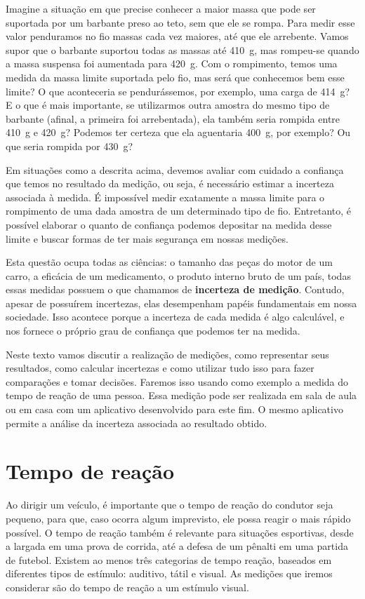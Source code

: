 \documentclass[12pt, a4paper]{article}
\begin{document}
Imagine a situação em que precise conhecer a maior massa que pode ser suportada por um barbante preso ao teto, sem que ele se rompa. Para medir esse valor penduramos no fio massas cada vez maiores, até que ele arrebente. Vamos supor que o barbante suportou todas as massas até 410~g, mas rompeu-se quando a massa suspensa foi aumentada para 420~g. Com o rompimento, temos uma medida da massa limite suportada pelo fio, mas será que conhecemos bem esse limite? O que aconteceria se pendurássemos, por exemplo, uma carga de 414~g? E o que é mais importante, se utilizarmos outra amostra do mesmo tipo de barbante (afinal, a primeira foi arrebentada), ela também seria rompida entre 410~g e 420~g? Podemos ter certeza que ela aguentaria 400~g, por exemplo? Ou que seria rompida por 430~g?

Em situações como a descrita acima, devemos avaliar com cuidado a confiança que temos no resultado da medição, ou seja, é necessário estimar a incerteza associada à medida. É impossível medir exatamente a massa limite para o rompimento de uma dada amostra de um determinado tipo de fio. Entretanto, é possível elaborar o quanto de confiança podemos depositar na medida desse limite e buscar formas de ter mais segurança em nossas medições.

Esta questão ocupa todas as ciências: o tamanho das peças do motor de um carro, a eficácia de um medicamento, o produto interno bruto de um país, todas essas medidas possuem o que chamamos de \textbf{incerteza de medição}. Contudo, apesar de possuírem incertezas, elas desempenham papéis fundamentais em nossa sociedade. Isso acontece porque a incerteza de cada medida é algo calculável, e nos fornece o próprio grau de confiança que podemos ter na medida.

Neste texto vamos discutir a realização de medições, como representar seus resultados, como calcular incertezas e como utilizar tudo isso para fazer comparações e tomar decisões. Faremos isso usando como exemplo a medida do tempo de reação de uma pessoa. Essa medição pode ser realizada em sala de aula ou em casa com um aplicativo desenvolvido para este fim. O mesmo aplicativo permite a análise da incerteza associada ao resultado obtido.

\section{Tempo de reação}

Ao dirigir um veículo, é importante que o tempo de reação do condutor seja pequeno, para que, caso ocorra algum imprevisto, ele possa reagir o mais rápido possível. O tempo de reação também é relevante para situações esportivas, desde a largada em uma prova de corrida, até a defesa de um pênalti em uma partida de futebol. 
Existem ao menos três categorias de tempo reação, baseados em diferentes tipos de estímulo: auditivo, tátil e visual. As medições que iremos considerar são do tempo de reação a um estímulo visual.
\end{document}
